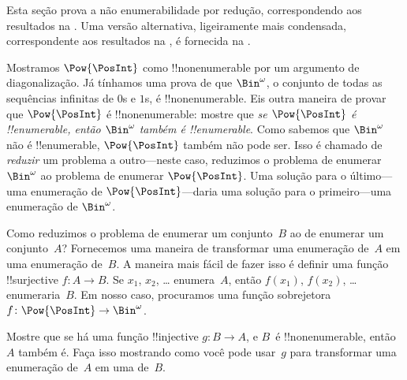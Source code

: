 \documentclass[../../../include/open-logic-section]{subfiles}
\begin{document}


\begin{editorial}
  Esta seção prova a não enumerabilidade por redução, correspondendo aos
  resultados na . Uma versão alternativa, ligeiramente mais condensada,
  correspondente aos resultados na , é fornecida na
  .
\end{editorial}

Mostramos $\Pow{\PosInt}$ como !!{nonenumerable} por um argumento de diagonalização.
Já tínhamos uma prova de que $\Bin^\omega$, o conjunto de todas as
sequências infinitas de $0$s e $1$s, é !!{nonenumerable}. Eis
outra maneira de provar que $\Pow{\PosInt}$ é !!{nonenumerable}:
mostre que \emph{se $\Pow{\PosInt}$ é !!{enumerable}, então $\Bin^\omega$
  também é !!{enumerable}}. Como sabemos que $\Bin^\omega$ não é
!!{enumerable}, $\Pow{\PosInt}$ também não pode ser. Isso é chamado de
\emph{reduzir} um problema a outro---neste caso, reduzimos o
problema de enumerar $\Bin^\omega$ ao problema de enumerar
$\Pow{\PosInt}$. Uma solução para o último---uma enumeração de
$\Pow{\PosInt}$---daria uma solução para o primeiro---uma enumeração
de $\Bin^\omega$.

Como reduzimos o problema de enumerar um conjunto~$B$ ao de
enumerar um conjunto~$A$? Fornecemos uma maneira de transformar uma enumeração
de~$A$ em uma enumeração de~$B$. A maneira mais fácil de fazer isso é
definir uma função !!{surjective} $f\colon A \to B$. Se $x_1$, $x_2$,
\dots{} enumera~$A$, então $f(x_1)$, $f(x_2)$, \dots{} enumeraria~$B$. Em nosso caso, procuramos uma função sobrejetora
$f\colon \Pow{\PosInt} \to \Bin^\omega$.

\begin{prob}
Mostre que se há uma função !!{injective} $g\colon B \to A$, e
$B$~é !!{nonenumerable}, então $A$ também é. Faça isso mostrando como você
pode usar~$g$ para transformar uma enumeração de~$A$ em uma de~$B$.
\end{prob}
\end{document}
